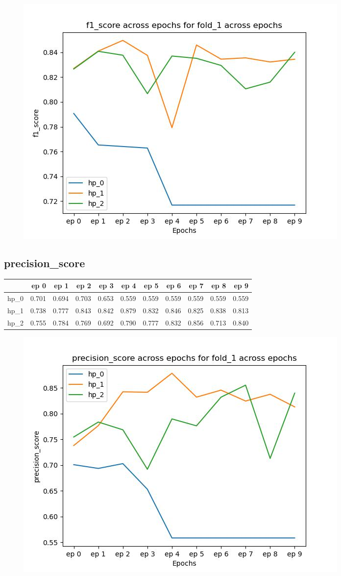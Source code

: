 \documentclass{article}
\begin{document}
\begin{figure}[H]
\includegraphics[scale = 0.75]{fold_1/f1_score}
\end{figure}
\subsection{precision\_score}
\begin{tabular}{lrrrrrrrrrr}
\toprule
{} &   ep 0 &   ep 1 &   ep 2 &   ep 3 &   ep 4 &   ep 5 &   ep 6 &   ep 7 &   ep 8 &   ep 9 \\
\midrule
hp\_0 &  0.701 &  0.694 &  0.703 &  0.653 &  0.559 &  0.559 &  0.559 &  0.559 &  0.559 &  0.559 \\
hp\_1 &  0.738 &  0.777 &  0.843 &  0.842 &  0.879 &  0.832 &  0.846 &  0.825 &  0.838 &  0.813 \\
hp\_2 &  0.755 &  0.784 &  0.769 &  0.692 &  0.790 &  0.777 &  0.832 &  0.856 &  0.713 &  0.840 \\
\bottomrule
\end{tabular}

\begin{figure}[H]
\includegraphics[scale = 0.75]{fold_1/precision_score}
\end{figure}
\end{document}
